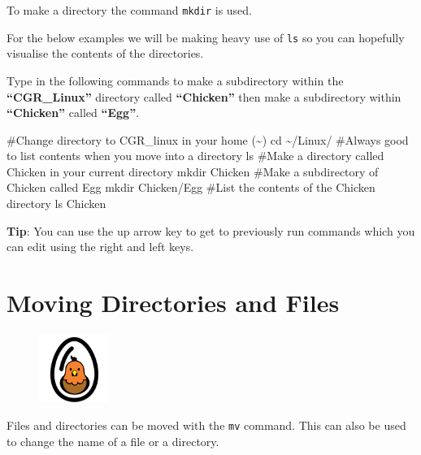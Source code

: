 \documentclass[
  letterpaper,
  DIV=11,
  numbers=noendperiod]{scrreprt}
\newenvironment{Shaded}{\begin{snugshade}}{\end{snugshade}}
\newcommand{\BuiltInTok}[1]{\textcolor[rgb]{0.00,0.23,0.31}{#1}}
\newcommand{\CommentTok}[1]{\textcolor[rgb]{0.37,0.37,0.37}{#1}}
\newcommand{\FunctionTok}[1]{\textcolor[rgb]{0.28,0.35,0.67}{#1}}
\newcommand{\NormalTok}[1]{\textcolor[rgb]{0.00,0.23,0.31}{#1}}
\begin{document}
To make a directory the command \texttt{mkdir} is used.

For the below examples we will be making heavy use of \texttt{ls} so you
can hopefully visualise the contents of the directories.

Type in the following commands to make a subdirectory within the
\textbf{``CGR\_Linux''} directory called \textbf{``Chicken''} then make
a subdirectory within \textbf{``Chicken''} called \textbf{``Egg''}.

\begin{Shaded}
\begin{Highlighting}[]
\CommentTok{\#Change directory to CGR\_linux in your home (\textasciitilde{})}
\BuiltInTok{cd}\NormalTok{ \textasciitilde{}/Linux/}
\CommentTok{\#Always good to list contents when you move into a directory}
\FunctionTok{ls}
\CommentTok{\#Make a directory called Chicken in your current directory}
\FunctionTok{mkdir}\NormalTok{ Chicken}
\CommentTok{\#Make a subdirectory of Chicken called Egg}
\FunctionTok{mkdir}\NormalTok{ Chicken/Egg}
\CommentTok{\#List the contents of the Chicken directory}
\FunctionTok{ls}\NormalTok{ Chicken}
\end{Highlighting}
\end{Shaded}

\textbf{Tip}: You can use the up arrow key to get to previously run
commands which you can edit using the right and left keys.

\hypertarget{moving-directories-and-files}{%
\section{Moving Directories and
Files}\label{moving-directories-and-files}}

\begin{figure}

{\centering \includegraphics[width=0.2\textwidth,height=\textheight]{figures/chicken.png}

}

\end{figure}

Files and directories can be moved with the \texttt{mv} command. This
can also be used to change the name of a file or a directory.
\end{document}
